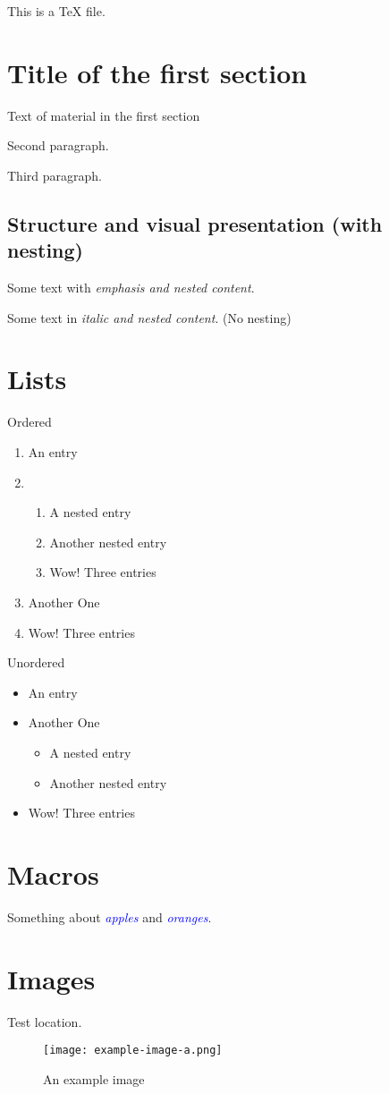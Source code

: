 \documentclass[12pt]{article}
\newcommand\kw[1]{\textcolor{blue}{\itshape #1}}
\begin{document}
This is a \TeX{} file.

\section{Title of the first section}

Text of material in the first section

Second paragraph.

Third paragraph.

\subsection{Structure and visual presentation (with nesting)}

Some text with \emph{emphasis and \emph{nested} content}.

Some text in \textit{italic and \textit{nested} content}. (No nesting)

\section{Lists}
Ordered
\begin{enumerate}
  \item An entry
  \item \begin{enumerate}
    \item A nested entry
    \item Another nested entry
    \item Wow! Three entries
  \end{enumerate}
  \item Another One
  \item Wow! Three entries
\end{enumerate}

Unordered
\begin{itemize}
  \item An entry
  \item Another One
  \begin{itemize}
    \item A nested entry
    \item Another nested entry
  \end{itemize}
  \item Wow! Three entries
\end{itemize}

\section{Macros}

Something about \kw{apples} and \kw{oranges}.

\section{Images}

Test location.
\begin{figure}[ht]
  \centering
  \texttt{[image: example-image-a.png]}
  \caption{An example image}
\end{figure}
\end{document}
